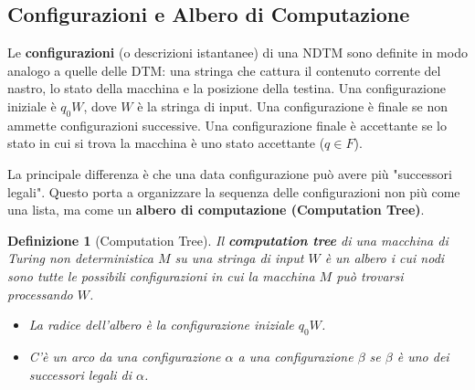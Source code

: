 \documentclass[a4paper, 11pt]{book} %
\newtheorem{definition}[theorem]{Definizione}
\theoremstyle{definition}
\begin{document}
\subsection{Configurazioni e Albero di Computazione}
Le \textbf{configurazioni} (o descrizioni istantanee) di una NDTM sono definite in modo analogo a quelle delle DTM: una stringa che cattura il contenuto corrente del nastro, lo stato della macchina e la posizione della testina.
Una configurazione iniziale è $q_0W$, dove $W$ è la stringa di input.
Una configurazione è finale se non ammette configurazioni successive. Una configurazione finale è accettante se lo stato in cui si trova la macchina è uno stato accettante ($q \in F$).

La principale differenza è che una data configurazione può avere più "successori legali". Questo porta a organizzare la sequenza delle configurazioni non più come una lista, ma come un \textbf{albero di computazione (Computation Tree)}.

\begin{definition}[Computation Tree]
Il \textbf{computation tree} di una macchina di Turing non deterministica $M$ su una stringa di input $W$ è un albero i cui nodi sono tutte le possibili configurazioni in cui la macchina $M$ può trovarsi processando $W$.
\begin{itemize}
    \item La radice dell'albero è la configurazione iniziale $q_0W$.
    \item C'è un arco da una configurazione $\alpha$ a una configurazione $\beta$ se $\beta$ è uno dei successori legali di $\alpha$.
\end{itemize}
\end{definition}
\end{document}
